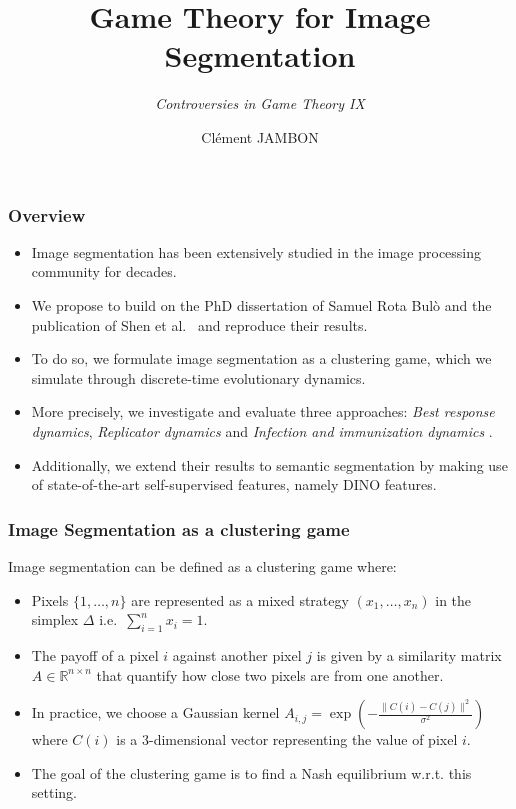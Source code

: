 \documentclass{beamer}
\title{Game Theory for Image Segmentation}
\subtitle{\textit{Controversies in Game Theory IX}}
\author[Clément JAMBON]{Clément JAMBON}
\institute[]{ETH Zürich}
\begin{document}
\frame{\titlepage}

\begin{frame}
    \frametitle{Overview}

    \begin{itemize}
        \item Image segmentation has been extensively studied in the image processing community for decades.
        \item We propose to build on the PhD dissertation of Samuel Rota Bulò\cite{bulo-thesis} and the publication of Shen et al.~\cite{game-clustering} and reproduce their results.
        \item To do so, we formulate image segmentation as a clustering game, which we simulate through discrete-time evolutionary dynamics.
        \item More precisely, we investigate and evaluate three approaches: \textit{Best response dynamics}, \textit{Replicator dynamics} and \textit{Infection and immunization dynamics} \cite{inimdyn}.
        \item Additionally, we extend their results to semantic segmentation by making use of state-of-the-art self-supervised features, namely DINO \cite{dino} features.
    \end{itemize}

\end{frame}

\begin{frame}
    \frametitle{Image Segmentation as a clustering game}
    Image segmentation can be defined as a clustering game where:
    \begin{itemize}
        \item Pixels $\{1, \ldots, n\}$ are represented as a mixed strategy $(x_1, \ldots, x_n)$ in the simplex $\Delta$ i.e.\ $\sum_{i=1}^nx_i=1$.
        \item The payoff of a pixel $i$ against another pixel $j$ is given by a similarity matrix $A\in\mathbb{R}^{n\times n}$ that quantify how close two pixels are from one another.
        \item In practice, we choose a Gaussian kernel $A_{i, j}=\exp\left(-\frac{\lVert C(i) - C(j)\rVert^2}{\sigma^2}\right)$ where $C(i)$ is a 3-dimensional vector representing the value of pixel $i$.
        \item The goal of the clustering game is to find a Nash equilibrium w.r.t. this setting.
    \end{itemize}
\end{frame}
\end{document}
